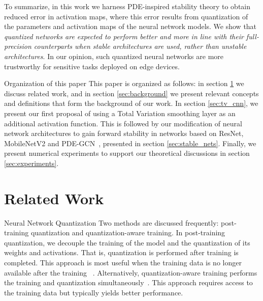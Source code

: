 \documentclass[reqno]{amsart}
\makeatletter
\def\paragraph{\@startsection{paragraph}{4}%
  \z@\z@{-\fontdimen2\font}%
  {\normalfont\bfseries}}
\makeatother
\begin{document}
To summarize, in this work we harness PDE-inspired stability theory to obtain reduced error in activation maps, where this error results from quantization of the parameters and activation maps of the neural network models. We show that \emph{quantized networks are expected to perform better and more in line with their full-precision counterparts when stable architectures are used, rather than unstable architectures}. In our opinion, such quantized neural networks are more trustworthy for sensitive tasks deployed on edge devices.

\paragraph{Organization of this paper}
This paper is organized as follows: in section \ref{sec:related_work} we discuss related work, and in section \ref{sec:background} we present relevant concepts and definitions that form the background of our work. In section \ref{sec:tv_cnn}, we present our first proposal of using a Total Variation smoothing layer as an additional activation function. This is followed by our modification of neural network architectures to gain forward stability in networks based on ResNet, MobileNetV2 and PDE-GCN~\cite{eliasof2021pdegcn}, presented in section \ref{sec:stable_nets}. Finally, we present numerical experiments to support our theoretical discussions in section \ref{sec:experiments}.

\section{Related Work}
\label{sec:related_work}

\paragraph{Neural Network Quantization}
Two methods are discussed frequently: post-training quantization and quantization-aware training. In post-training quantization, we decouple the training of the model and the quantization of its weights and activations. That is, quantization is performed after training is completed. This approach is most useful when the training data is no longer available after the training ~\cite{soudry1,postq1,nagel2019dfq}. Alternatively, quantization-aware training performs the training and quantization simultaneously~\cite{hubara2017quantized}. This approach requires access to the training data but typically yields better performance.
\end{document}
